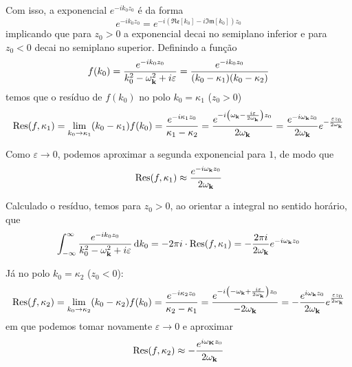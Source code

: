 Com isso, a exponencial $e^{-ik_{0}z_{0}}$ é da forma
    \begin{equation*}
        e^{-ik_{0}z_{0}} = e^{-i(\mathfrak{Re}[k_{0}] - i\mathfrak{Im}[k_{0}])z_{0}}
    \end{equation*}
implicando que para $z_{0}>0$ a exponencial decai no semiplano inferior e para $z_{0}<0$ decai no semiplano superior. Definindo a função
    \begin{equation*}
        f(k_{0}) = \dfrac{e^{-ik_{0}z_{0}}}{k_{0}^2-\omega_{\vb{k}}^2 + i\varepsilon} = \dfrac{e^{-ik_{0}z_{0}}}{(k_{0}-\kappa_{1})(k_{0}-\kappa_{2})}
    \end{equation*}
temos que o resíduo de $f(k_{0})$ no polo $k_{0} = \kappa_{1}$ ($z_{0}>0$)
    \begin{equation*}
        \text{Res}(f,\kappa_{1}) = \lim_{k_{0}\to\kappa_{1}} (k_{0}-\kappa_{1})f(k_{0}) = \dfrac{e^{-i\kappa_{1}z_{0}}}{\kappa_{1}-\kappa_{2}} = \dfrac{e^{-i\qty(\omega_{\vb{k}}-\frac{i\varepsilon}{2\omega_{\vb{k}}})z_{0}}}{2\omega_{\vb{k}}} = \dfrac{e^{-i\omega_{\vb{k}}z_{0}}}{2\omega_{\vb{k}}}e^{-\frac{\varepsilon z_{0}}{2\omega_{\vb{k}}}}
    \end{equation*}

Como $\varepsilon\to0$, podemos aproximar a segunda exponencial para $1$, de modo que
    \begin{equation*}
        \text{Res}(f,\kappa_{1}) \approx \dfrac{e^{-i\omega_{\vb{k}}z_{0}}}{2\omega_{\vb{k}}}
    \end{equation*}

Calculado o resíduo, temos para $z_{0}>0$, ao orientar a integral no sentido horário, que
    \begin{equation*}
        \int_{-\infty}^{\infty} \dfrac{e^{-ik_{0}z_{0}}}{k_{0}^2-\omega_{\vb{k}}^2+i\varepsilon} \dd{k_{0}} = -2\pi i \cdot \text{Res}(f,\kappa_{1}) = -\dfrac{2\pi i}{2\omega_{\vb{k}}}e^{-i\omega_{\vb{k}}z_{0}}
    \end{equation*}

Já no polo $k_{0} = \kappa_{2}$ ($z_{0}<0$):
    \begin{equation*}
        \text{Res}(f,\kappa_{2}) = \lim_{k_{0}\to\kappa_{2}}(k_{0}-\kappa_{2})f(k_{0}) = \dfrac{e^{-i\kappa_{2}z_{0}}}{\kappa_{2} - \kappa_{1}} = \dfrac{e^{-i\qty(-\omega_{\vb{k}} + \frac{i\varepsilon}{2\omega_{\vb{k}}})z_{0}}}{-2\omega_{\vb{k}}} = -\dfrac{e^{i\omega_{\vb{k}}z_{0}}}{2\omega_{\vb{k}}}e^{\frac{\varepsilon z_{0}}{2\omega_{\vb{k}}}}
    \end{equation*}
em que podemos tomar novamente $\varepsilon\to 0$ e aproximar
    \begin{equation*}
        \text{Res}(f,\kappa_{2}) \approx -\dfrac{e^{i\omega_{\vb{K}}z_{0}}}{2\omega_{\vb{k}}}
    \end{equation*}


